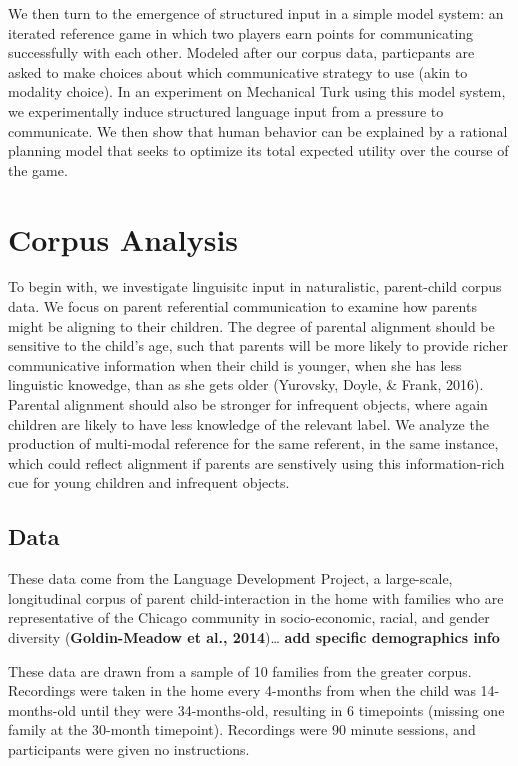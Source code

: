\documentclass[10pt, letterpaper]{article}
\begin{document}
We then turn to the emergence of structured input in a simple model
system: an iterated reference game in which two players earn points for
communicating successfully with each other. Modeled after our corpus
data, particpants are asked to make choices about which communicative
strategy to use (akin to modality choice). In an experiment on
Mechanical Turk using this model system, we experimentally induce
structured language input from a pressure to communicate. We then show
that human behavior can be explained by a rational planning model that
seeks to optimize its total expected utility over the course of the
game.

\section{Corpus Analysis}\label{corpus-analysis}

To begin with, we investigate linguisitc input in naturalistic,
parent-child corpus data. We focus on parent referential communication
to examine how parents might be aligning to their children. The degree
of parental alignment should be sensitive to the child's age, such that
parents will be more likely to provide richer communicative information
when their child is younger, when she has less linguistic knowedge, than
as she gets older (Yurovsky, Doyle, \& Frank, 2016). Parental alignment
should also be stronger for infrequent objects, where again children are
likely to have less knowledge of the relevant label. We analyze the
production of multi-modal reference for the same referent, in the same
instance, which could reflect alignment if parents are senstively using
this information-rich cue for young children and infrequent objects.

\subsection{Data}\label{data}

These data come from the Language Development Project, a large-scale,
longitudinal corpus of parent child-interaction in the home with
families who are representative of the Chicago community in
socio-economic, racial, and gender diversity (\textbf{Goldin-Meadow et
al., 2014})\ldots{} \textbf{add specific demographics info}

These data are drawn from a sample of 10 families from the greater
corpus. Recordings were taken in the home every 4-months from when the
child was 14-months-old until they were 34-months-old, resulting in 6
timepoints (missing one family at the 30-month timepoint). Recordings
were 90 minute sessions, and participants were given no instructions.
\end{document}
